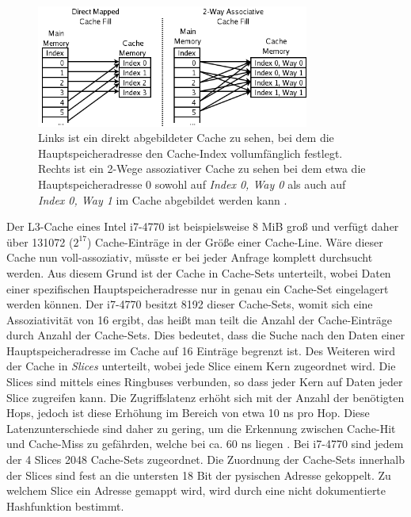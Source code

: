 \label{fig:CacheAsso}
\begin{figure}[h]
\centering
\includegraphics[width=0.8\textwidth]{basics/Cache_Asso.png}
\caption{Links ist ein direkt abgebildeter Cache zu sehen, bei dem die Hauptspeicheradresse den Cache-Index vollumfänglich festlegt. Rechts ist ein 2-Wege assoziativer Cache zu sehen bei dem etwa die Hauptspeicheradresse 0 sowohl auf \textit{Index 0, Way 0} als auch auf \textit{Index 0, Way 1} im Cache abgebildet werden kann \cite{CacheAssoWiki}.}
\end{figure}


Der L3-Cache eines Intel i7-4770 ist beispielsweise 8 MiB groß und verfügt daher über 131072 ($2^{17}$) Cache-Einträge in der Größe einer Cache-Line. 
Wäre dieser Cache nun voll-assoziativ, müsste er bei jeder Anfrage komplett durchsucht werden. Aus diesem Grund ist der Cache in Cache-Sets unterteilt, wobei Daten einer spezifischen Hauptspeicheradresse nur in genau ein Cache-Set eingelagert werden können. 
Der i7-4770 besitzt 8192 dieser Cache-Sets, womit sich eine Assoziativität von 16 ergibt, das heißt man teilt die Anzahl der Cache-Einträge durch Anzahl der Cache-Sets. Dies bedeutet, dass die Suche nach den Daten einer Hauptspeicheradresse im Cache auf 16 Einträge begrenzt ist. 
Des Weiteren wird der Cache in \textit{Slices} unterteilt, wobei jede Slice einem Kern zugeordnet wird. Die Slices sind mittels eines Ringbuses verbunden, so dass jeder Kern auf Daten jeder Slice zugreifen kann. Die Zugriffslatenz erhöht sich mit der Anzahl der benötigten Hops, jedoch ist diese Erhöhung im Bereich von etwa 10 ns pro Hop. Diese Latenzunterschiede sind daher zu gering, um die Erkennung zwischen Cache-Hit und Cache-Miss zu gefährden, welche bei ca. 60 ns liegen \cite{TheSpyInTheSandbox}. Bei i7-4770 sind jedem der 4 Slices 2048 Cache-Sets zugeordnet. Die Zuordnung der Cache-Sets innerhalb der Slices sind fest an die untersten 18 Bit der pysischen Adresse gekoppelt. Zu welchem Slice ein Adresse gemappt wird, wird durch eine nicht dokumentierte Hashfunktion bestimmt.

